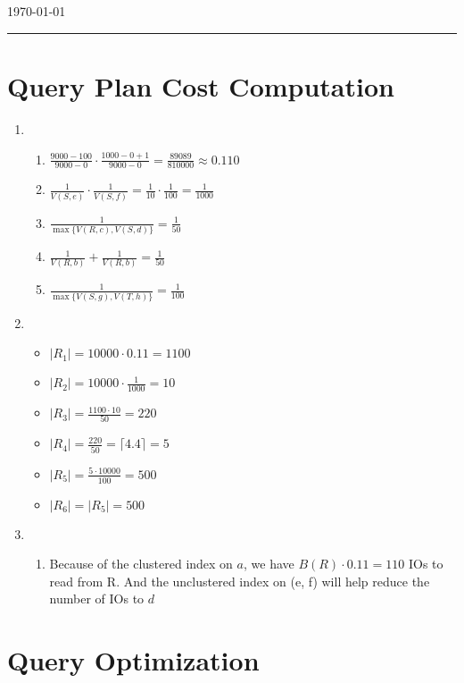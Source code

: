 \documentclass[10pt]{myland}
\begin{document}
\begin{center}
	{\Large {}} \\
	\vspace{.05in}
    \quad{}\\
	\vspace{.05in}
    \today \\
\end{center}
\vspace{.15in} \hrule \vspace{0.5em}%

\section{Query Plan Cost Computation}
\begin{enumerate}[label=\textbf{\arabic*.}, listparindent=0.0em, itemsep=1em]
  \item 
    \begin{enumerate}[label=\textbf{(\alph*)}, listparindent=0.0em, itemsep=1em] 
      \item $\frac{9000 - 100}{9000 - 0} \cdot \frac{1000 - 0 + 1}{9000 - 0} = \frac{89089}{810000} \approx 0.110$
      \item $\frac{1}{V(S, e)}\cdot\frac{1}{V(S, f)} = \frac{1}{10}\cdot\frac{1}{100} = \frac{1}{1000}$
      \item $\frac{1}{\max\{V(R, c), V(S, d)\}} = \frac{1}{50}$
      \item $\frac{1}{V(R, b)} + \frac{1}{V(R, b)} = \frac{1}{50}$
      \item $\frac{1}{\max\{V(S, g), V(T, h)\}} = \frac{1}{100}$
    \end{enumerate}
  \item 
    \begin{itemize}
      \item $|R_1| = 10000\cdot 0.11 = 1100$
      \item $|R_2| = 10000\cdot\frac{1}{1000} = 10$
      \item $|R_3| = \frac{1100\cdot 10}{50} = 220$
      \item $|R_4| = \frac{220}{50} = \lceil 4.4\rceil = 5$
      \item $|R_5| = \frac{5\cdot 10000}{100} = 500$
      \item $|R_6| = |R_5| = 500$
    \end{itemize}
  \item 
    \begin{enumerate}[label=\textbf{(\alph*)}, listparindent=0.0em, itemsep=1em] 
      \item Because of the clustered index on $a$, we have $B(R)\cdot 0.11 = 110$ IOs to read from R. And the unclustered index 
        on (e, f) will help reduce the number of IOs to $d$
    \end{enumerate}
\end{enumerate}


\section{Query Optimization}
\end{document}
